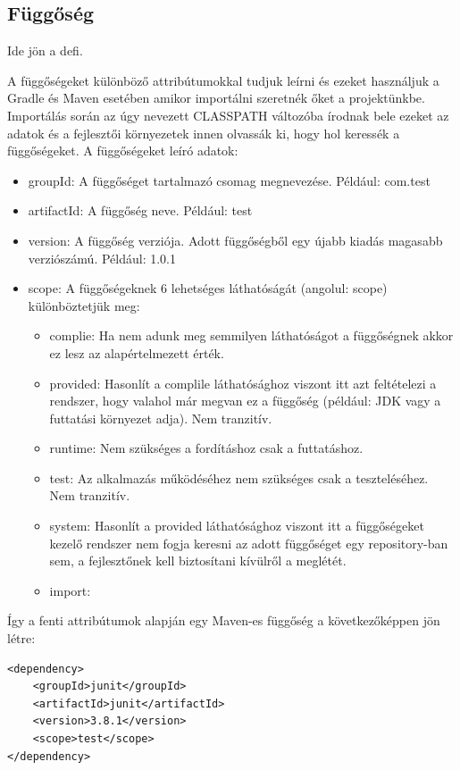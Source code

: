 \documentclass{article}
\begin{document}
\subsection{Függőség}\label{subsec:dependency}
Ide jön a defi.

A függőségeket különböző attribútumokkal tudjuk leírni és ezeket használjuk a Gradle és Maven esetében amikor importálni szeretnék őket a projektünkbe. Importálás során az úgy nevezett CLASSPATH változóba írodnak bele ezeket az adatok és a fejlesztői környezetek innen olvassák ki, hogy hol keressék a függőségeket. A függőségeket leíró adatok:
\begin{itemize}
	\item groupId: A függőséget tartalmazó csomag megnevezése. Például: com.test
	\item artifactId: A függőség neve. Például: test
	\item version: A függőség verziója. Adott függőségből egy újabb kiadás magasabb verziószámú. Például: 1.0.1
	\item scope: A függőségeknek 6 lehetséges láthatóságát (angolul: scope) különböztetjük meg:
	\begin{itemize}
		\item complie: Ha nem adunk meg semmilyen láthatóságot a függőségnek akkor ez lesz az alapértelmezett érték.
		\item provided: Hasonlít a complile láthatósághoz viszont itt azt feltételezi a rendszer, hogy valahol már megvan ez a függőség (például: JDK vagy a futtatási környezet adja). Nem tranzitív. 
		\item runtime: Nem szükséges a fordításhoz csak a futtatáshoz.
		\item test: Az alkalmazás működéséhez nem szükséges csak a teszteléséhez. Nem tranzitív.
		\item system: Hasonlít a provided láthatósághoz viszont itt a függőségeket kezelő rendszer nem fogja keresni az adott függőséget egy repository-ban sem, a fejlesztőnek kell biztosítani kívülről a meglétét.
		\item import: 
	\end{itemize}
\end{itemize}
Így a fenti attribútumok alapján egy Maven-es függőség a következőképpen jön létre:
\begin{lstlisting}
<dependency>
	<groupId>junit</groupId>
	<artifactId>junit</artifactId>
	<version>3.8.1</version>
	<scope>test</scope>
</dependency>
\end{lstlisting}
\end{document}
